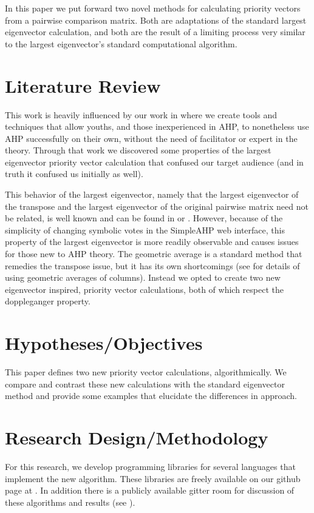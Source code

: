 \documentclass[11pt]{article}
\begin{document}
In this paper we put forward two novel methods for calculating priority
vectors from a pairwise comparison matrix.  Both are adaptations of the
standard largest eigenvector calculation, and both are the result of a limiting
process very similar to the largest eigenvector's standard computational
algorithm.

\section{Literature Review}
This work is heavily influenced by our work in \cite{adamsmont} where we create
tools and techniques that allow youths, and those inexperienced in AHP, to
nonetheless use AHP successfully on their own, without the need of 
facilitator or expert in the theory.  Through that work we discovered some
properties of the largest eigenvector priority vector calculation that
confused our target audience (and in truth it confused us initially as well).

This behavior of the largest eigenvector, namely that the largest eigenvector
of the transpose and the largest eigenvector of the original pairwise matrix need
not be related, is well known and can be found in \cite{choo2004common} or
\cite{saaty1990eigenvector}.
However, because of the simplicity of changing symbolic votes in the SimpleAHP
web interface, this property of the largest eigenvector is more readily observable
and causes issues for those new to AHP theory.
The geometric average is a standard method that remedies the transpose issue, but
it has its own shortcomings (see \cite{barzilai1994ahp} for details of using
geometric averages of columns).  Instead we opted to create two new
eigenvector inspired, priority vector calculations, both of which respect the
doppleganger property.

\section{Hypotheses/Objectives}
This paper defines two new priority vector calculations, algorithmically.
We compare and contrast these new calculations with the standard eigenvector
method and provide some examples that elucidate the differences in approach.

\section{Research Design/Methodology}
For this research, we develop programming libraries for several languages that
implement the new algorithm.  These libraries are freely available on our github
page at \cite{githubahppri}.  In addition there is a publicly available gitter
room for discussion of these algorithms and results (see \cite{gitterahppri}).
\end{document}
